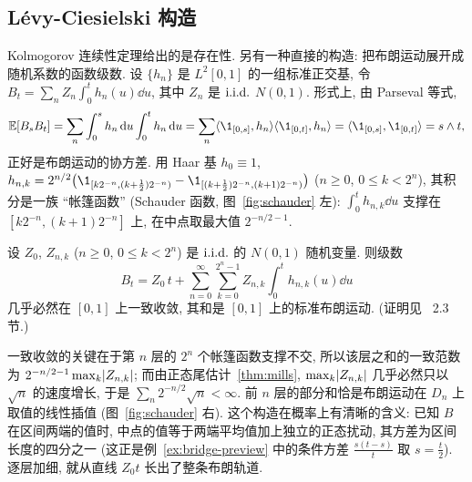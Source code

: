 \subsection{L\'evy-Ciesielski 构造}

Kolmogorov 连续性定理给出的是存在性. 另有一种直接的构造: 把布朗运动展开成随机系数的函数级数. 设 $\{h_n\}$ 是 $L^2[0,1]$ 的一组标准正交基, 令 $B_t=\sum_nZ_n\int_0^th_n(u)\dd u$, 其中 $Z_n$ 是 $\text{i.i.d.}$ $N(0,1)$. 形式上, 由 Parseval 等式,
\[
\E[B_sB_t]=\sum_n\int_0^sh_n\dd u\int_0^th_n\dd u=\sum_n\ip{\1_{[0,s]},h_n}\ip{\1_{[0,t]},h_n}=\ip{\1_{[0,s]},\1_{[0,t]}}=s\wedge t,
\]
正好是布朗运动的协方差. 用 Haar 基 $h_0\equiv1$, $h_{n,k}=2^{n/2}\big(\1_{[k2^{-n},(k+\frac{1}{2})2^{-n})}-\1_{[(k+\frac{1}{2})2^{-n},(k+1)2^{-n})}\big)$ ($n\ge0$, $0\le k<2^n$), 其积分是一族 ``帐篷函数'' (Schauder 函数, 图~\ref{fig:schauder} 左): $\int_0^th_{n,k}\dd u$ 支撑在 $[k2^{-n},(k+1)2^{-n}]$ 上, 在中点取最大值 $2^{-n/2-1}$.

\begin{theorem}\label{thm:levy-ciesielski}
设 $Z_0$, $Z_{n,k}$ ($n\ge0$, $0\le k<2^n$) 是 $\text{i.i.d.}$ 的 $N(0,1)$ 随机变量. 则级数
\[
B_t=Z_0\,t+\sum_{n=0}^\infty\sum_{k=0}^{2^n-1}Z_{n,k}\int_0^th_{n,k}(u)\dd u
\]
几乎必然在 $[0,1]$ 上一致收敛, 其和是 $[0,1]$ 上的标准布朗运动. (证明见~\cite{karatzas} 2.3 节.)
\end{theorem}

一致收敛的关键在于第 $n$ 层的 $2^n$ 个帐篷函数支撑不交, 所以该层之和的一致范数为 $2^{-n/2-1}\max_k\lvert Z_{n,k}\rvert$; 而由正态尾估计~\ref{thm:mills}, $\max_k\lvert Z_{n,k}\rvert$ 几乎必然只以 $\sqrt{n}$ 的速度增长, 于是 $\sum_n2^{-n/2}\sqrt{n}<\infty$. 前 $n$ 层的部分和恰是布朗运动在 $D_n$ 上取值的线性插值 (图~\ref{fig:schauder} 右). 这个构造在概率上有清晰的含义: 已知 $B$ 在区间两端的值时, 中点的值等于两端平均值加上独立的正态扰动, 其方差为区间长度的四分之一 (这正是例~\ref{ex:bridge-preview} 中的条件方差 $\frac{s(t-s)}{t}$ 取 $s=\frac{t}{2}$). 逐层加细, 就从直线 $Z_0t$ 长出了整条布朗轨道.

